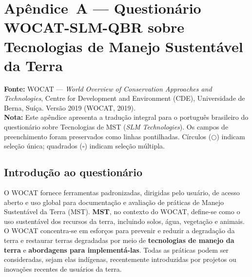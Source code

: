 %
%

\appendix
\section*{Apêndice~A --- Questionário WOCAT-SLM-QBR sobre Tecnologias de Manejo Sustentável da Terra}
\label{app:wocat}
\setcounter{table}{0}
\renewcommand{\thetable}{A\arabic{table}}
\setcounter{figure}{0}
\renewcommand{\thefigure}{A\arabic{figure}}

\noindent\textbf{Fonte:} WOCAT --- \textit{World Overview of Conservation Approaches and Technologies}, Centre for Development and Environment (CDE), Universidade de Berna, Suíça. Versão 2019 (WOCAT, 2019).\\[6pt]
\noindent\textbf{Nota:} Este apêndice apresenta a tradução integral para o português brasileiro do questionário sobre Tecnologias de MST (\textit{SLM Technologies}). Os campos de preenchimento foram preservados como linhas pontilhadas. Círculos ($\bigcirc$) indicam seleção única; quadrados ($\square$) indicam seleção múltipla.

\subsection*{Introdução ao questionário}

O WOCAT fornece ferramentas padronizadas, dirigidas pelo usuário, de acesso aberto e uso global para documentação e avaliação de práticas de Manejo Sustentável da Terra (MST). \textbf{MST}, no contexto do WOCAT, define-se como o uso sustentável dos recursos da terra, incluindo solos, água, vegetação e animais. O WOCAT concentra-se em esforços para prevenir e reduzir a degradação da terra e restaurar terras degradadas por meio de \textbf{tecnologias de manejo da terra} e \textbf{abordagens para implementá-las}. Todas as práticas podem ser consideradas, sejam elas indígenas, recentemente introduzidas por projetos ou inovações recentes de usuários da terra.

